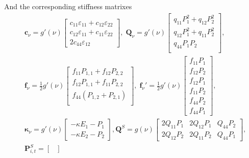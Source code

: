 \documentclass[times,fleqn,11pt]{elsarticle}
\begin{document}
And the corresponding stiffness matrixes
\begin{equation}
\begin{split}
        &
        \mathbf{c}_\nu=g'(\nu)\begin{bmatrix}
            c_{11}\varepsilon_{11}+c_{12}\varepsilon_{22} \\
            c_{12}\varepsilon_{11}+c_{11}\varepsilon_{22} \\
            2c_{44}\varepsilon_{12}
        \end{bmatrix},\;
        \mathbf{Q}_\nu=g'(\nu)\begin{bmatrix}
            q_{11}P_1^2+q_{12}P_2^2 \\
            q_{12}P_1^2+q_{11}P_2^2 \\
            q_{44}P_1P_2 \\
        \end{bmatrix},\; \\
        &
        \mathbf{f}_\nu=\frac{1}{2}g'(\nu)\begin{bmatrix}
            f_{11}P_{1,1}+f_{12}P_{2,2} \\
            f_{12}P_{1,1}+f_{11}P_{2,2} \\
            f_{44}(P_{1,2}+P_{2,1}) \\
        \end{bmatrix},\;        
        \mathbf{f}_\nu'=\frac{1}{2}g'(\nu)\begin{bmatrix}
            f_{11}P_1 \\
            f_{12}P_2 \\
            f_{12}P_1 \\
            f_{11}P_2 \\
            f_{44}P_2 \\
            f_{44}P_1
        \end{bmatrix}, \\
        &
        \mathbf{\kappa}_\nu=g'(\nu)\begin{bmatrix}
            -\kappa E_1 - P_1 \\
            -\kappa E_2 - P_2 
        \end{bmatrix},
        \mathbf{Q}^S=g(\nu)\begin{bmatrix}
            2Q_{11}P_1 & 2Q_{12}P_1 & Q_{44}P_2 \\
            2Q_{12}P_2 & 2Q_{11}P_2 & Q_{44}P_1
        \end{bmatrix}, \\
        &
        \mathbf{P}_{i,t}^S=\begin{bmatrix}

\end{bmatrix}
\end{split}
\end{equation}
\end{document}

